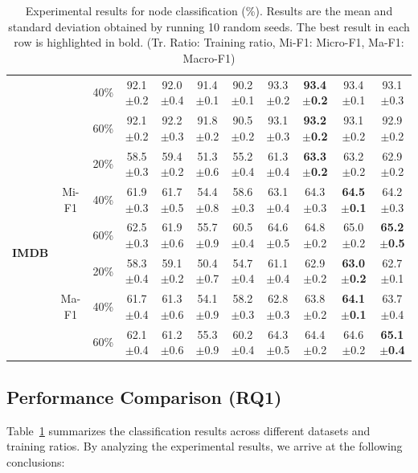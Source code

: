 \documentclass[letterpaper]{article} %
\begin{document}
\begin{table}[t]
\begin{tabular}{c|c|c|ccccccc|c}
 &                        & 40\% & 92.1$\pm$0.2 & 92.0$\pm$0.4 & 91.4$\pm$0.1 & 90.2$\pm$0.1 & 93.3$\pm$0.2 & \textbf{93.4$\pm$0.2} & 93.4$\pm$0.1 & 93.1$\pm$0.3 \\
 &                        & 60\% & 92.1$\pm$0.2 & 92.2$\pm$0.3 & 91.8$\pm$0.2 & 90.5$\pm$0.2 & 93.1$\pm$0.3 & \textbf{93.2$\pm$0.2} & 93.1$\pm$0.2 & 92.9$\pm$0.2 \\
\midrule
\multirow{6}{*}{\textbf{IMDB}} 
 & \multirow{3}{*}{Mi-F1} & 20\% & 58.5$\pm$0.3 & 59.4$\pm$0.2 & 51.3$\pm$0.6 & 55.2$\pm$0.4 & 61.3$\pm$0.4 & \textbf{63.3$\pm$0.2} & 63.2$\pm$0.2 & 62.9$\pm$0.2 \\
 &                        & 40\% & 61.9$\pm$0.3 & 61.7$\pm$0.5 & 54.4$\pm$0.8 & 58.6$\pm$0.3 & 63.1$\pm$0.4 & 64.3$\pm$0.3 & \textbf{64.5$\pm$0.1} & 64.2$\pm$0.3 \\
 &                        & 60\% & 62.5$\pm$0.3 & 61.9$\pm$0.6 & 55.7$\pm$0.9 & 60.5$\pm$0.4 & 64.6$\pm$0.5 & 64.8$\pm$0.2 & 65.0$\pm$0.2 & \textbf{65.2$\pm$0.5} \\
 \cmidrule{2-11}
 & \multirow{3}{*}{Ma-F1} & 20\% & 58.3$\pm$0.4 & 59.1$\pm$0.2 & 50.4$\pm$0.7 & 54.7$\pm$0.4 & 61.1$\pm$0.4 & 62.9$\pm$0.2 & \textbf{63.0$\pm$0.2} & 62.7$\pm$0.1 \\
 &                        & 40\% & 61.7$\pm$0.4 & 61.3$\pm$0.6 & 54.1$\pm$0.9 & 58.2$\pm$0.3 & 62.8$\pm$0.3 & 63.8$\pm$0.2 & \textbf{64.1$\pm$0.1} & 63.7$\pm$0.4 \\
 &                        & 60\% & 62.1$\pm$0.4 & 61.2$\pm$0.6 & 55.3$\pm$0.9 & 60.2$\pm$0.4 & 64.3$\pm$0.5 & 64.4$\pm$0.2 & 64.6$\pm$0.2 & \textbf{65.1$\pm$0.4} \\
\bottomrule
\end{tabular}
\caption{Experimental results for node classification (\%). Results are the mean and standard deviation obtained by running 10 random seeds. The best result in each row is highlighted in bold. (Tr. Ratio: Training ratio, Mi-F1: Micro-F1, Ma-F1: Macro-F1)}
\label{tab2}
\end{table}

\subsection{Performance Comparison (RQ1)}
Table~\ref{tab2} summarizes the classification results across different datasets and training ratios.  By analyzing the experimental results, we arrive at the following conclusions:
\end{document}
